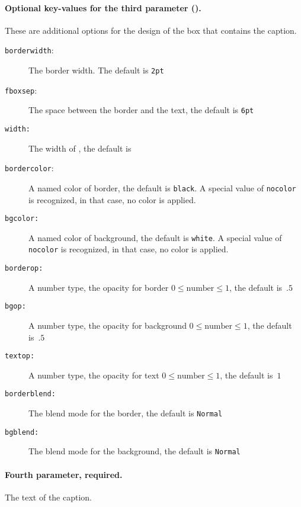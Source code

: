 \documentclass{article}
\begin{document}
\paragraph*{Optional key-values for the third parameter ().} These are additional options for the design
of the box that contains the caption.
\begin{description}
   \item[\texttt{borderwidth}:] The border width. The default is \texttt{2pt}
   \item[\texttt{fboxsep}:] The space between the border and the text, the default is \texttt{6pt}
   \item[\texttt{width:}] The width of , the default is 
   \item[\texttt{bordercolor}:] A named color of border, the default is \texttt{black}. A special value
   of \texttt{nocolor} is recognized, in that case, no color is applied.
   \item[\texttt{bgcolor:}] A named color of background, the default is \texttt{white}. A special value
   of \texttt{nocolor} is recognized, in that case, no color is applied.
   \item[\texttt{borderop:}] A number type, the opacity for border $0 \le \mbox{number} \le 1$, the default is~$.5$
   \item[\texttt{bgop:}] A number type, the opacity for background $0 \le \mbox{number} \le 1$, the default is~$.5$
   \item[\texttt{textop:}] A number type, the opacity for text $0 \le \mbox{number} \le 1$, the default is~$1$
   \item[\texttt{borderblend:}] The blend mode for the border, the default is \texttt{Normal}
   \item[\texttt{bgblend:}] The blend mode for the background, the default is \texttt{Normal}
\end{description}

\paragraph*{Fourth parameter, required.} The text of the caption.
\end{document}
